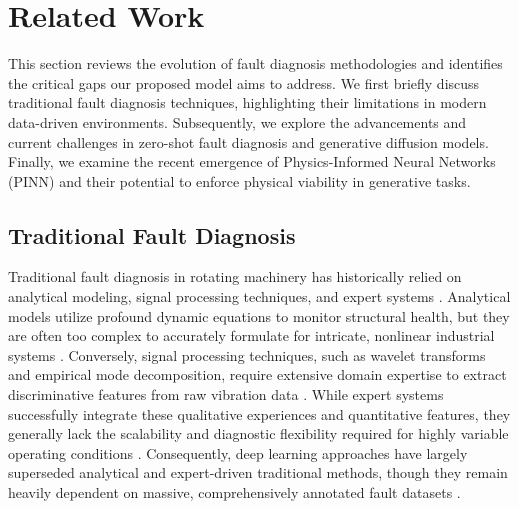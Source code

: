 \section{Related Work}
\label{sec:related}

This section reviews the evolution of fault diagnosis methodologies and identifies the critical gaps our proposed model aims to address. We first briefly discuss traditional fault diagnosis techniques, highlighting their limitations in modern data-driven environments. Subsequently, we explore the advancements and current challenges in zero-shot fault diagnosis and generative diffusion models. Finally, we examine the recent emergence of Physics-Informed Neural Networks (PINN) and their potential to enforce physical viability in generative tasks.

\subsection{Traditional Fault Diagnosis}
Traditional fault diagnosis in rotating machinery has historically relied on analytical modeling, signal processing techniques, and expert systems \cite{randall2011rolling,jardine2006review}. Analytical models utilize profound dynamic equations to monitor structural health, but they are often too complex to accurately formulate for intricate, nonlinear industrial systems \cite{jardine2006review}. Conversely, signal processing techniques, such as wavelet transforms and empirical mode decomposition, require extensive domain expertise to extract discriminative features from raw vibration data \cite{yan2014wavelets}. While expert systems successfully integrate these qualitative experiences and quantitative features, they generally lack the scalability and diagnostic flexibility required for highly variable operating conditions \cite{zhao2019deep}. Consequently, deep learning approaches have largely superseded analytical and expert-driven traditional methods, though they remain heavily dependent on massive, comprehensively annotated fault datasets \cite{lei2020applications}.

